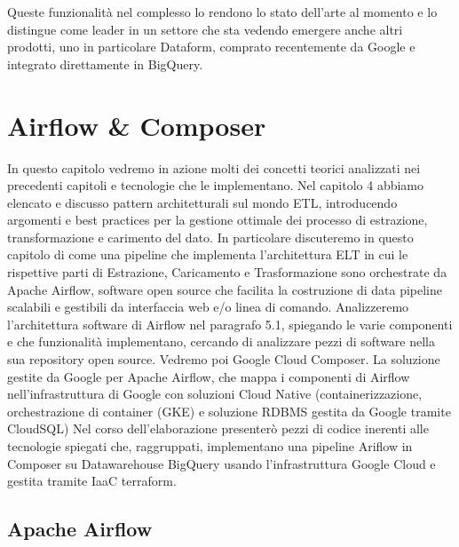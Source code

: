 \documentclass[a4paper,12pt]{report}
\begin{document}
\noindent
Queste funzionalità nel complesso lo rendono lo stato dell’arte al momento  e lo distingue come leader in un settore che sta vedendo emergere anche altri prodotti, uno in particolare Dataform, comprato recentemente da Google e integrato direttamente in BigQuery.
\chapter{Airflow \& Composer}
\thispagestyle{empty} %
\fancyhead{} %
\fancyhead[R]{\thepage} %
In questo capitolo vedremo in azione molti dei concetti teorici analizzati nei precedenti capitoli e tecnologie che le implementano.
Nel capitolo 4 abbiamo elencato e discusso pattern architetturali sul mondo ETL, introducendo argomenti e best practices per la gestione ottimale dei processo di estrazione, transformazione e carimento del dato. 
In particolare discuteremo in questo capitolo di come una pipeline che implementa l'architettura ELT in cui le rispettive parti di Estrazione, Caricamento e Trasformazione sono orchestrate da Apache Airflow, software open source che facilita la costruzione di data pipeline scalabili e gestibili da interfaccia web e/o linea di comando.
Analizzeremo l'architettura software di Airflow nel paragrafo 5.1, spiegando le varie componenti e che funzionalità implementano, cercando di analizzare pezzi di software nella sua repository open source.
Vedremo poi Google Cloud Composer. La soluzione gestite da Google per Apache Airflow, che mappa i componenti di Airflow nell'infrastruttura di Google con soluzioni Cloud Native (containerizzazione, orchestrazione di container (GKE) e soluzione RDBMS gestita da Google tramite CloudSQL)
Nel corso dell’elaborazione presenterò pezzi di codice inerenti alle tecnologie spiegati che,  raggruppati, implementano una pipeline Ariflow in Composer su Datawarehouse BigQuery usando l’infrastruttura Google Cloud e gestita tramite IaaC terraform.
\section{Apache Airflow}
\end{document}
